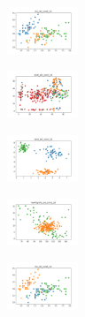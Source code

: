 \begin{figure}[H]
\begin{subfigure}
    \end{subfigure}
    \hfill
    \begin{subfigure}
        \centering
        \includegraphics[width=0.234\textwidth]{img/aggun/iris_set_const_10_589741062_clust.png}
    \end{subfigure}
    \hfill
    \begin{subfigure}
        \centering
        \includegraphics[width=0.234\textwidth]{img/aggun/ecoli_set_const_10_589741062_clust.png}
    \end{subfigure}
    \hfill
    \begin{subfigure}
        \centering
        \includegraphics[width=0.234\textwidth]{img/aggun/rand_set_const_10_589741062_clust.png}
    \end{subfigure}
    \hfill
    \begin{subfigure}
        \centering
        \includegraphics[width=0.234\textwidth]{img/aggun/newthyroid_set_const_10_589741062_clust.png}
    \end{subfigure}
    \hfill
    \begin{subfigure}
        \centering
        \includegraphics[width=0.234\textwidth]{img/aggun/iris_set_const_10_277451237_clust.png}
    \end{subfigure}
    \hfill

\end{figure}

